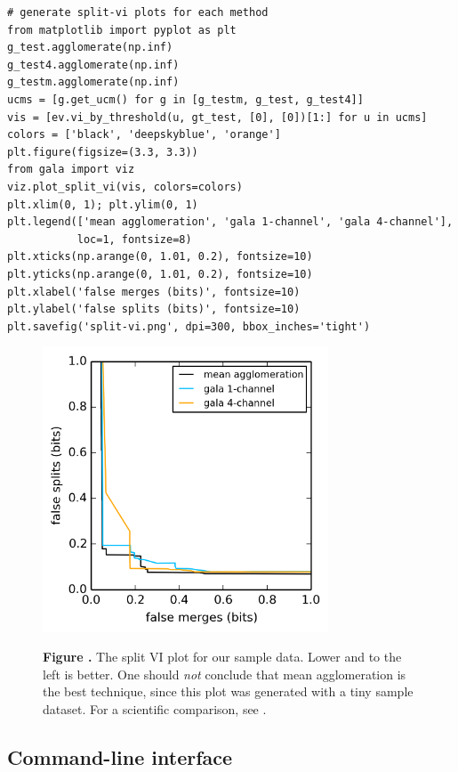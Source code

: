 \documentclass{frontiersSCNS} %
\begin{document}
{\small
\begin{verbatim}
# generate split-vi plots for each method
from matplotlib import pyplot as plt
g_test.agglomerate(np.inf)
g_test4.agglomerate(np.inf)
g_testm.agglomerate(np.inf)
ucms = [g.get_ucm() for g in [g_testm, g_test, g_test4]]
vis = [ev.vi_by_threshold(u, gt_test, [0], [0])[1:] for u in ucms]
colors = ['black', 'deepskyblue', 'orange']
plt.figure(figsize=(3.3, 3.3))
from gala import viz
viz.plot_split_vi(vis, colors=colors)
plt.xlim(0, 1); plt.ylim(0, 1)
plt.legend(['mean agglomeration', 'gala 1-channel', 'gala 4-channel'],
           loc=1, fontsize=8)
plt.xticks(np.arange(0, 1.01, 0.2), fontsize=10)
plt.yticks(np.arange(0, 1.01, 0.2), fontsize=10)
plt.xlabel('false merges (bits)', fontsize=10)
plt.ylabel('false splits (bits)', fontsize=10)
plt.savefig('split-vi.png', dpi=300, bbox_inches='tight')
\end{verbatim}
}

\begin{figure}
\begin{center}
\includegraphics[width=85mm]{figure2}
\end{center}
 \textbf{\label{fig:02} Figure .}{ The split VI plot for our sample data. Lower and to the left is better. One should \emph{not} conclude that mean agglomeration is the best technique, since this plot was generated with a tiny sample dataset. For a scientific comparison, see \cite{NunezIglesias:2013cd}. }
\end{figure}

\subsection{Command-line interface}
\end{document}
